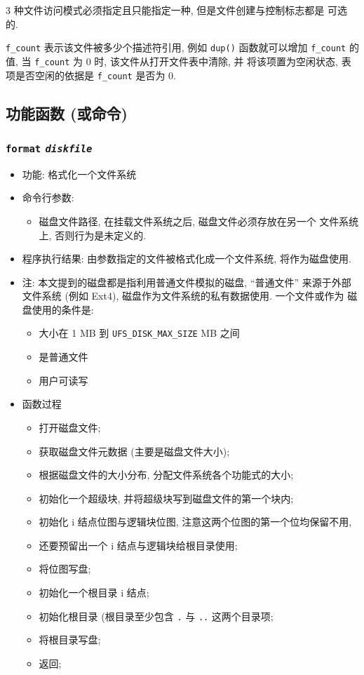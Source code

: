 \documentclass[nofonts]{ctexart}
\begin{document}
3 种文件访问模式必须指定且只能指定一种, 但是文件创建与控制标志都是
可选的.

\texttt{f\_count} 表示该文件被多少个描述符引用, 例如 \texttt{dup()}
函数就可以增加 \texttt{f\_count} 的值, 当 \texttt{f\_count} 为 0 时,
该文件从打开文件表中清除, 并 将该项置为空闲状态, 表项是否空闲的依据是
\texttt{f\_count} 是否为 0.

\subsection{功能函数
(或命令)}\label{ux529fux80fdux51fdux6570-ux6216ux547dux4ee4}

\subsubsection{\texttt{format} \emph{\texttt{diskfile}}}
\begin{itemize}
\item
  功能: 格式化一个文件系统
\item
  命令行参数:

  \begin{itemize}
  \item
    磁盘文件路径, 在挂载文件系统之后, 磁盘文件必须存放在另一个
    文件系统上, 否则行为是未定义的.
  \end{itemize}
\item
  程序执行结果: 由参数指定的文件被格式化成一个文件系统, 将作为磁盘使用.
\item
  注: 本文提到的磁盘都是指利用普通文件模拟的磁盘, ``普通文件''
  来源于外部 文件系统 (例如 Ext4), 磁盘作为文件系统的私有数据使用.
  一个文件或作为 磁盘使用的条件是:

  \begin{itemize}
  \item
    大小在 1 MB 到 \texttt{UFS\_DISK\_MAX\_SIZE} MB 之间
  \item
    是普通文件
  \item
    用户可读写
  \end{itemize}
\item
  函数过程

  \begin{itemize}
  \item
    打开磁盘文件;
  \item
    获取磁盘文件元数据 (主要是磁盘文件大小);
  \item
    根据磁盘文件的大小分布, 分配文件系统各个功能式的大小;
  \item
    初始化一个超级块, 并将超级块写到磁盘文件的第一个块内;
  \item
    初始化 i 结点位图与逻辑块位图, 注意这两个位图的第一个位均保留不用,
  \item
    还要预留出一个 i 结点与逻辑块给根目录使用;
  \item
    将位图写盘;
  \item
    初始化一个根目录 i 结点;
  \item
    初始化根目录 (根目录至少包含 \texttt{.} 与 \texttt{..} 这两个目录项;
  \item
    将根目录写盘;
  \item
    返回;
  \end{itemize}
\end{itemize}
\end{document}
